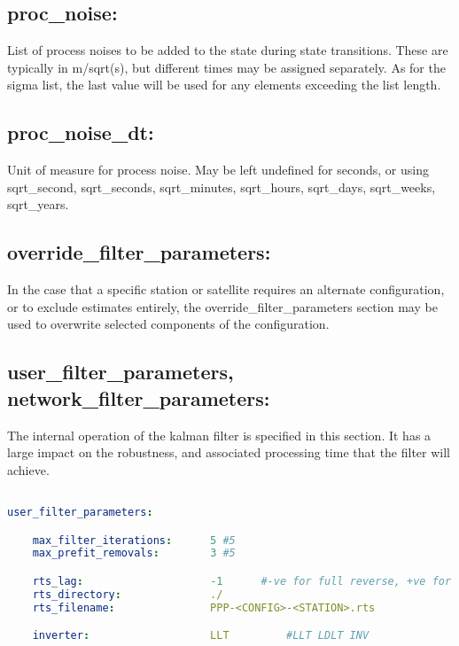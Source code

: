 \subsection*{proc\_noise:}

List of process noises to be added to the state during state transitions. These are typically in m/sqrt(s), but different times may be assigned separately.
As for the sigma list, the last value will be used for any elements exceeding the list length.

\subsection*{proc\_noise\_dt:}

Unit of measure for process noise. 
May be left undefined for seconds, or using sqrt\_second, sqrt\_seconds, sqrt\_minutes, sqrt\_hours, sqrt\_days, sqrt\_weeks, sqrt\_years.

\subsection{override\_filter\_parameters:}

In the case that a specific station or satellite requires an alternate configuration, or to exclude estimates entirely, the override\_filter\_parameters section may be used to overwrite selected components of the configuration.


\subsection{user\_filter\_parameters, network\_filter\_parameters:}

The internal operation of the kalman filter is specified in this section. It has a large impact on the robustness, and associated processing time that the filter will achieve.

\begin{lstlisting}[language=yaml,caption=Filter Operating Parameters:]

user_filter_parameters:

    max_filter_iterations:      5 #5
    max_prefit_removals:        3 #5

    rts_lag:                    -1      #-ve for full reverse, +ve for limited epochs
    rts_directory:              ./
    rts_filename:               PPP-<CONFIG>-<STATION>.rts

    inverter:                   LLT         #LLT LDLT INV

\end{lstlisting}


